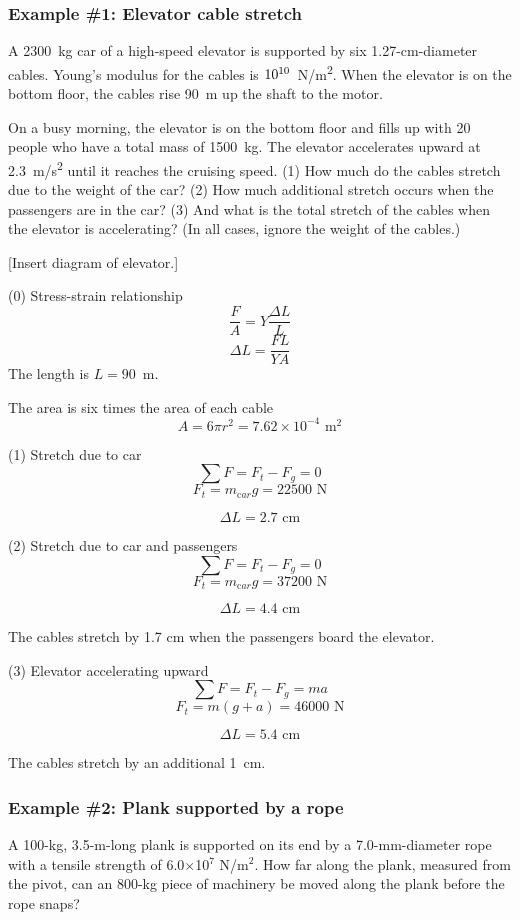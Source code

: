 \subsubsection*{Example \#1: Elevator cable stretch}
A 2300~kg car of a high-speed elevator is supported by six 1.27-cm-diameter cables. Young's modulus for the cables is $10\time10^{10}$~N/m\textsuperscript{2}. When the elevator is on the bottom floor, the cables rise 90~m up the shaft to the motor.

On a busy morning, the elevator is on the bottom floor and fills up with 20 people who have a total mass of 1500~kg. The elevator accelerates upward at 2.3~m/s\textsuperscript{2} until it reaches the cruising speed. (1) How much do the cables stretch due to the weight of the car? (2) How much additional stretch occurs when the passengers are in the car? (3) And what is the total stretch of the cables when the elevator is accelerating? (In all cases, ignore the weight of the cables.)

[Insert diagram of elevator.]
\vspace{4cm}

(0) Stress-strain relationship
$$\frac{F}{A} = Y\frac{\Delta L}{L}$$
$$\Delta L = \frac{FL}{YA}$$
The length is $L=90$~m.

The area is six times the area of each cable
$$A = 6\pi r^2 = 7.62\times 10^{-4}\mbox{ m}^2$$

(1) Stretch due to car
$$\sum F = F_t - F_g = 0$$
$$F_t = m_{\mathrm car}g = 22500\mbox{ N}$$

$$\boxed{\Delta L = 2.7\mbox{ cm}}$$

(2) Stretch due to car and passengers
$$\sum F = F_t - F_g = 0$$
$$F_t = m_{\mathrm car}g = 37200\mbox{ N}$$

$$\boxed{\Delta L = 4.4\mbox{ cm}}$$

The cables stretch by 1.7 cm when the passengers board the elevator.

(3) Elevator accelerating upward
$$\sum F = F_t - F_g = ma$$
$$F_t = m(g+a) = 46000\mbox{ N}$$

$$\boxed{\Delta L = 5.4\mbox{ cm}}$$

The cables stretch by an additional 1~cm.


\subsubsection*{Example \#2: Plank supported by a rope}
A 100-kg, 3.5-m-long plank is supported on its end by a 7.0-mm-diameter rope with a tensile strength of 6.0$\times$10$^7$ N/m$^2$. How far along the plank, measured from the pivot, can an 800-kg piece of machinery be moved along the plank before the rope snaps?

